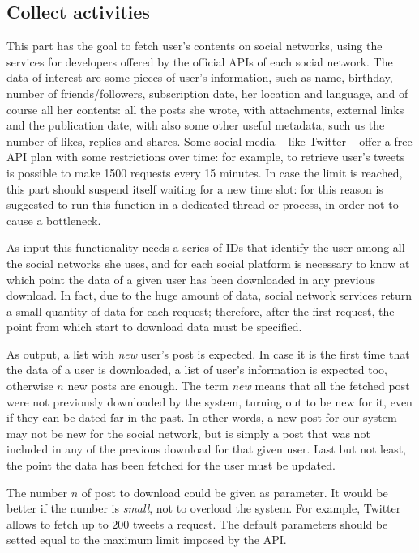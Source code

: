\subsection{Collect activities}
This part has the goal to fetch user's contents on social networks, using the services for developers offered by the official APIs of each social network. The data of interest are some pieces of user's information, such as name, birthday, number of friends/followers, subscription date, her location and language, and of course all her contents: all the posts she wrote, with attachments, external links and the publication date, with also some other useful metadata, such us the number of likes, replies and shares. Some social media -- like Twitter -- offer a free API plan with some restrictions over time: for example, to retrieve user's tweets is possible to make 1500 requests every 15 minutes. In case the limit is reached, this part should suspend itself waiting for a new time slot: for this reason is suggested to run this function in a dedicated thread or process, in order not to cause a bottleneck.

As input this functionality needs a series of IDs that identify the user among all the social networks she uses, and for each social platform is necessary to know at which point the data of a given user has been downloaded in any previous download. In fact, due to the huge amount of data, social network services return a small quantity of data for each request; therefore, after the first request, the point from which start to download data must be specified.

As output, a list with \emph{new} user's post is expected. In case it is the first time that the data of a user is downloaded, a list of user's information is expected too, otherwise $ n $ new posts are enough. The term \emph{new} means that all the fetched post were not previously downloaded by the system, turning out to be new for it, even if they can be dated far in the past. In other words, a new post for our system may not be new for the social network, but is simply a post that was not included in any of the previous download for that given user. Last but not least, the point the data has been fetched for the user must be updated.

The number $ n $ of post to download could be given as parameter. It would be better if the number is \emph{small}, not to overload the system. For example, Twitter allows to fetch up to $ 200 $ tweets a request. The default parameters should be setted equal to the maximum limit imposed by the API.

